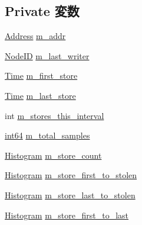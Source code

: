\subsection*{Private 変数}
\begin{DoxyCompactItemize}
\item 
\hyperlink{classAddress}{Address} \hyperlink{classStoreTrace_a82a0fb091bb145547996e49b5ee3dde2}{m\_\-addr}
\item 
\hyperlink{TypeDefines_8hh_a83c14b4ae37e80071f6b3506a6c46151}{NodeID} \hyperlink{classStoreTrace_a51c0ba60343448ac6477c9c463f90d39}{m\_\-last\_\-writer}
\item 
\hyperlink{classTime}{Time} \hyperlink{classStoreTrace_a4220de8e855258c441dbcb645d6f29fe}{m\_\-first\_\-store}
\item 
\hyperlink{classTime}{Time} \hyperlink{classStoreTrace_a17a1ccf0863647f7c02aabecbb8e5d42}{m\_\-last\_\-store}
\item 
int \hyperlink{classStoreTrace_a485540277254f896991b32f7516cc1e9}{m\_\-stores\_\-this\_\-interval}
\item 
\hyperlink{TypeDefines_8hh_aecfc3c54bd29ad5964e1c1c3ccbf89df}{int64} \hyperlink{classStoreTrace_a856f84e90c81bf66f21611e9a4e657e0}{m\_\-total\_\-samples}
\item 
\hyperlink{classHistogram}{Histogram} \hyperlink{classStoreTrace_abf62f1f677d6b1d69f0b191b202b2d29}{m\_\-store\_\-count}
\item 
\hyperlink{classHistogram}{Histogram} \hyperlink{classStoreTrace_a3b2f6c763179ad46dae8afaf72c7489d}{m\_\-store\_\-first\_\-to\_\-stolen}
\item 
\hyperlink{classHistogram}{Histogram} \hyperlink{classStoreTrace_adb07d36400dbe7cdef7162da9b6f3abd}{m\_\-store\_\-last\_\-to\_\-stolen}
\item 
\hyperlink{classHistogram}{Histogram} \hyperlink{classStoreTrace_a5ccdd7b4ad643d4cefda8caadbdef371}{m\_\-store\_\-first\_\-to\_\-last}
\end{DoxyCompactItemize}
